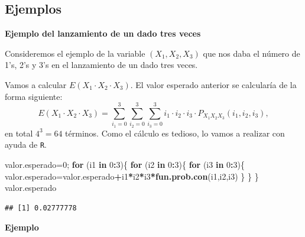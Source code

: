 \documentclass[]{book}
\newenvironment{Shaded}{\begin{snugshade}}{\end{snugshade}}
\newcommand{\ControlFlowTok}[1]{\textcolor[rgb]{0.13,0.29,0.53}{\textbf{#1}}}
\newcommand{\DecValTok}[1]{\textcolor[rgb]{0.00,0.00,0.81}{#1}}
\newcommand{\KeywordTok}[1]{\textcolor[rgb]{0.13,0.29,0.53}{\textbf{#1}}}
\newcommand{\NormalTok}[1]{#1}
\newcommand{\OperatorTok}[1]{\textcolor[rgb]{0.81,0.36,0.00}{\textbf{#1}}}
\begin{document}
\hypertarget{ejemplos-15}{%
\subsection{Ejemplos}\label{ejemplos-15}}

\textbf{Ejemplo del lanzamiento de un dado tres veces}

Consideremos el ejemplo de la variable \((X_1,X_2,X_3)\) que nos daba el número de 1's, 2's y 3's en el lanzamiento de un dado tres veces.

Vamos a calcular \(E\left(X_1\cdot X_2\cdot X_3\right)\).
El valor esperado anterior se calcularía de la forma siguiente:
\[
E\left(X_1\cdot X_2\cdot X_3\right)=\sum_{i_1=0}^3\sum_{i_2=0}^3
\sum_{i_3=0}^3 i_1\cdot i_2\cdot i_3\cdot P_{X_1X_2X_3}(i_1,i_2,i_3),
\]
en total \(4^3=64\) términos. Como el cálculo es tedioso, lo vamos a realizar con ayuda de \texttt{R}.

\begin{Shaded}
\begin{Highlighting}[]
\NormalTok{valor.esperado=}\DecValTok{0}\NormalTok{;}
\ControlFlowTok{for}\NormalTok{ (i1 }\ControlFlowTok{in} \DecValTok{0}\OperatorTok{:}\DecValTok{3}\NormalTok{)\{}
  \ControlFlowTok{for}\NormalTok{ (i2 }\ControlFlowTok{in} \DecValTok{0}\OperatorTok{:}\DecValTok{3}\NormalTok{)\{}
    \ControlFlowTok{for}\NormalTok{ (i3 }\ControlFlowTok{in} \DecValTok{0}\OperatorTok{:}\DecValTok{3}\NormalTok{)\{}
\NormalTok{      valor.esperado=valor.esperado}\OperatorTok{+}\NormalTok{i1}\OperatorTok{*}\NormalTok{i2}\OperatorTok{*}\NormalTok{i3}\OperatorTok{*}\KeywordTok{fun.prob.con}\NormalTok{(i1,i2,i3)}
\NormalTok{    \}}
\NormalTok{  \}}
\NormalTok{\}}
\NormalTok{valor.esperado}
\end{Highlighting}
\end{Shaded}

\begin{verbatim}
## [1] 0.02777778
\end{verbatim}

\textbf{Ejemplo}
\end{document}
